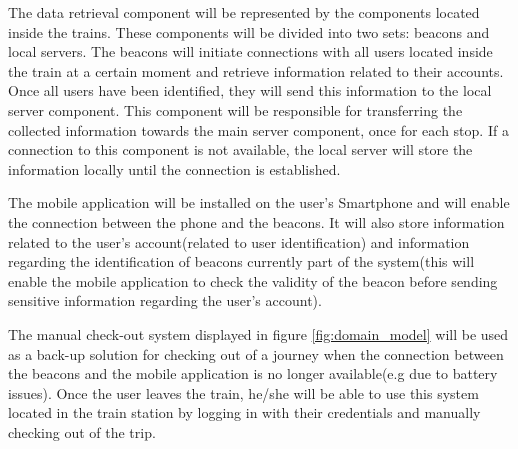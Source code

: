 The data retrieval component will be represented by the components located inside the trains. These components will be divided into two sets: beacons and local servers. The beacons will initiate connections with all users located inside the train at a certain moment and retrieve information related to their accounts. Once all users have been identified, they will send this information to the local server component. This component will be responsible for transferring the collected information towards the main server component, once for each stop. If a connection to this component is not available, the local server will store the information locally until the connection is established.

The mobile application will be installed on the user's Smartphone and will enable the connection between the phone and the beacons. It will also store information related to the user's account(related to user identification) and information regarding the identification of beacons currently part of the system(this will enable the mobile application to check the validity of the beacon before sending sensitive information regarding the user's account).

The manual check-out system displayed in figure \ref{fig:domain_model} will be used as a back-up solution for checking out of a journey when the connection between the beacons and the mobile application is no longer available(e.g due to battery issues). Once the user leaves the train, he/she will be able to use this system located in the train station by logging in with their credentials and manually checking out of the trip.